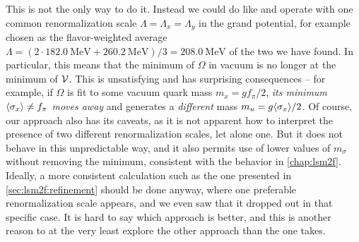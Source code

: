 This is not the only way to do it.
Instead we could do like \cite{ref:master_berge} and operate with one common renormalization scale $\Lambda = \Lambda_x = \Lambda_y$ in the grand potential,
for example chosen as the flavor-weighted average $\Lambda = (2 \cdot \SI{182.0}{\mega\electronvolt} + \SI{260.2}{\mega\electronvolt}) / 3 = \SI{208.0}{\mega\electronvolt}$ of the two we have found.
In particular, this means that the minimum of $\Omega$ in vacuum is no longer at the minimum of $\mathcal{V}$.
This is unsatisfying and has surprising consequences --
for example, if $\Omega$ is fit to some vacuum quark mass $m_x = g f_\pi/2$,
\emph{its minimum $\langle \sigma_x \rangle \neq f_\pi$ moves away} and generates a \emph{different} mass $m_u = g \langle \sigma_x \rangle / 2$.
Of course, our approach also has its caveats, as it is not apparent how to interpret the presence of two different renormalization scales, let alone one.
But it does not behave in this unpredictable way, and it also permits use of lower values of $m_\sigma$ without removing the minimum,
consistent with the behavior in \cref{chap:lsm2f}.
Ideally, a more consistent calculation such as the one presented in \cref{sec:lsm2f:refinement} should be done anyway,
where one preferable renormalization scale appears, and we even saw that it dropped out in that specific case.
It is hard to say which approach is better,
and this is another reason to at the very least explore the other approach than the one \cite{ref:master_berge} takes.

